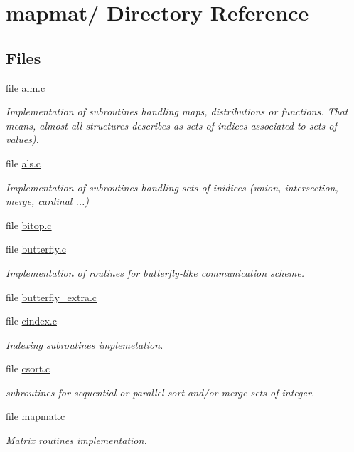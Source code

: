 \section{mapmat/ Directory Reference}
\label{dir_8c8771d589320e8518161c4534c99c34}
\subsection*{Files}
\begin{DoxyCompactItemize}
\item 
file \hyperlink{alm_8c}{alm.\-c}
\begin{DoxyCompactList}\small\item\em Implementation of subroutines handling maps, distributions or functions. That means, almost all structures describes as sets of indices associated to sets of values). \end{DoxyCompactList}\item 
file \hyperlink{als_8c}{als.\-c}
\begin{DoxyCompactList}\small\item\em Implementation of subroutines handling sets of inidices (union, intersection, merge, cardinal ...) \end{DoxyCompactList}\item 
file \hyperlink{bitop_8c}{bitop.\-c}
\item 
file \hyperlink{butterfly_8c}{butterfly.\-c}
\begin{DoxyCompactList}\small\item\em Implementation of routines for butterfly-\/like communication scheme. \end{DoxyCompactList}\item 
file \hyperlink{butterfly__extra_8c}{butterfly\-\_\-extra.\-c}
\item 
file \hyperlink{cindex_8c}{cindex.\-c}
\begin{DoxyCompactList}\small\item\em Indexing subroutines implemetation. \end{DoxyCompactList}\item 
file \hyperlink{csort_8c}{csort.\-c}
\begin{DoxyCompactList}\small\item\em subroutines for sequential or parallel sort and/or merge sets of integer. \end{DoxyCompactList}\item 
file \hyperlink{mapmat_8c}{mapmat.\-c}
\begin{DoxyCompactList}\small\item\em Matrix routines implementation. \end{DoxyCompactList}\item 

\end{DoxyCompactItemize}
